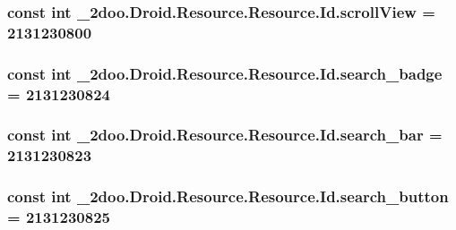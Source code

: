 \hypertarget{class__2doo_1_1_droid_1_1_resource_1_1_id_3980aaa1655c615b2eb8d03bd13f38bb}{
\subsubsection[{scrollView}]{\setlength{\rightskip}{0pt plus 5cm}const int \_\-2doo.Droid.Resource.Resource.Id.scrollView = 2131230800}}
\label{class__2doo_1_1_droid_1_1_resource_1_1_id_3980aaa1655c615b2eb8d03bd13f38bb}


\hypertarget{class__2doo_1_1_droid_1_1_resource_1_1_id_3c2f4ecf2b0f85124fbc675b37cbf34a}{
\subsubsection[{search\_\-badge}]{\setlength{\rightskip}{0pt plus 5cm}const int \_\-2doo.Droid.Resource.Resource.Id.search\_\-badge = 2131230824}}
\label{class__2doo_1_1_droid_1_1_resource_1_1_id_3c2f4ecf2b0f85124fbc675b37cbf34a}


\hypertarget{class__2doo_1_1_droid_1_1_resource_1_1_id_a8e0a2126f8e17dc4a7d1bd305d7179d}{
\subsubsection[{search\_\-bar}]{\setlength{\rightskip}{0pt plus 5cm}const int \_\-2doo.Droid.Resource.Resource.Id.search\_\-bar = 2131230823}}
\label{class__2doo_1_1_droid_1_1_resource_1_1_id_a8e0a2126f8e17dc4a7d1bd305d7179d}


\hypertarget{class__2doo_1_1_droid_1_1_resource_1_1_id_0fce900d3d7be421119b2e6e80041e42}{
\subsubsection[{search\_\-button}]{\setlength{\rightskip}{0pt plus 5cm}const int \_\-2doo.Droid.Resource.Resource.Id.search\_\-button = 2131230825}}
\label{class__2doo_1_1_droid_1_1_resource_1_1_id_0fce900d3d7be421119b2e6e80041e42}


